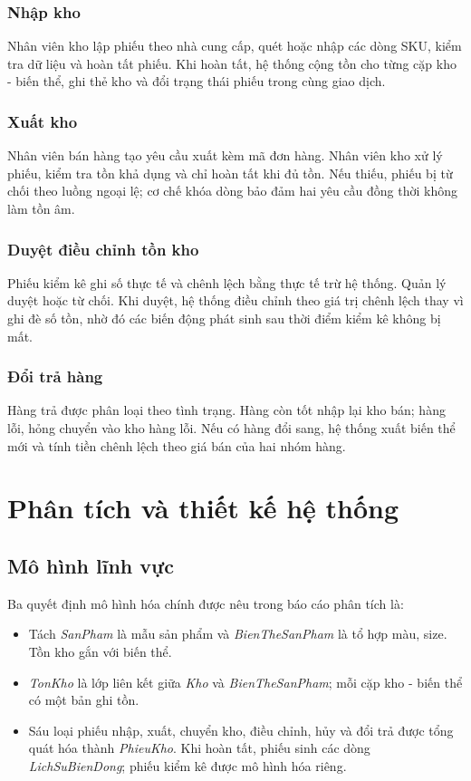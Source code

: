 \documentclass[12pt,a4paper]{report}
\begin{document}
\subsection{Nhập kho}
Nhân viên kho lập phiếu theo nhà cung cấp, quét hoặc nhập các dòng SKU, kiểm tra dữ liệu và hoàn tất phiếu. Khi hoàn tất, hệ thống cộng tồn cho từng cặp kho - biến thể, ghi thẻ kho và đổi trạng thái phiếu trong cùng giao dịch.

\subsection{Xuất kho}
Nhân viên bán hàng tạo yêu cầu xuất kèm mã đơn hàng. Nhân viên kho xử lý phiếu, kiểm tra tồn khả dụng và chỉ hoàn tất khi đủ tồn. Nếu thiếu, phiếu bị từ chối theo luồng ngoại lệ; cơ chế khóa dòng bảo đảm hai yêu cầu đồng thời không làm tồn âm.

\subsection{Duyệt điều chỉnh tồn kho}
Phiếu kiểm kê ghi số thực tế và chênh lệch bằng thực tế trừ hệ thống. Quản lý duyệt hoặc từ chối. Khi duyệt, hệ thống điều chỉnh theo giá trị chênh lệch thay vì ghi đè số tồn, nhờ đó các biến động phát sinh sau thời điểm kiểm kê không bị mất.

\subsection{Đổi trả hàng}
Hàng trả được phân loại theo tình trạng. Hàng còn tốt nhập lại kho bán; hàng lỗi, hỏng chuyển vào kho hàng lỗi. Nếu có hàng đổi sang, hệ thống xuất biến thể mới và tính tiền chênh lệch theo giá bán của hai nhóm hàng.

\chapter{Phân tích và thiết kế hệ thống}

\section{Mô hình lĩnh vực}

Ba quyết định mô hình hóa chính được nêu trong báo cáo phân tích là:
\begin{itemize}
\item Tách \textit{SanPham} là mẫu sản phẩm và \textit{BienTheSanPham} là tổ hợp màu, size. Tồn kho gắn với biến thể.
\item \textit{TonKho} là lớp liên kết giữa \textit{Kho} và \textit{BienTheSanPham}; mỗi cặp kho - biến thể có một bản ghi tồn.
\item Sáu loại phiếu nhập, xuất, chuyển kho, điều chỉnh, hủy và đổi trả được tổng quát hóa thành \textit{PhieuKho}. Khi hoàn tất, phiếu sinh các dòng \textit{LichSuBienDong}; phiếu kiểm kê được mô hình hóa riêng.
\end{itemize}
\end{document}
